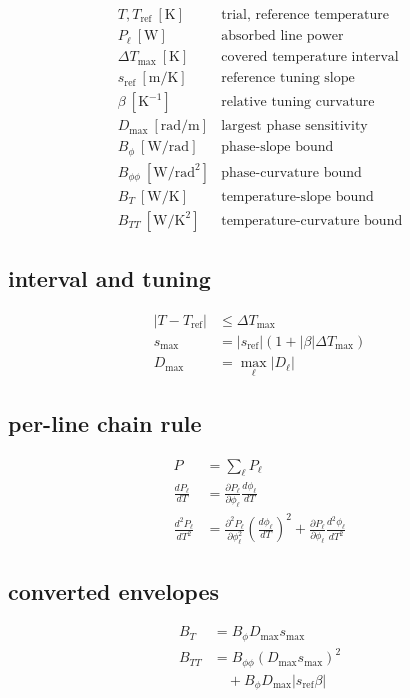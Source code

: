 \[
\begin{array}{ll}T,T_{\mathrm{ref}}\ [\mathrm K]&\text{trial, reference temperature}\\[0.6em]P_\ell\ [\mathrm W]&\text{absorbed line power}\\[0.6em]\Delta T_{\max}\ [\mathrm K]&\text{covered temperature interval}\\[0.6em]s_{\mathrm{ref}}\ [\mathrm{m/K}]&\text{reference tuning slope}\\[0.6em]\beta\ [\mathrm{K}^{-1}]&\text{relative tuning curvature}\\[0.6em]D_{\max}\ [\mathrm{rad/m}]&\text{largest phase sensitivity}\\[0.6em]B_\phi\ [\mathrm{W/rad}]&\text{phase-slope bound}\\[0.6em]B_{\phi\phi}\ [\mathrm{W/rad^2}]&\text{phase-curvature bound}\\[0.6em]B_T\ [\mathrm{W/K}]&\text{temperature-slope bound}\\[0.6em]B_{TT}\ [\mathrm{W/K^2}]&\text{temperature-curvature bound}\end{array}
\]

\subsection*{interval and tuning}
\[
\displaystyle \begin{aligned}|T-T_{\mathrm{ref}}|&\le\Delta T_{\max}\\s_{\max}&=|s_{\mathrm{ref}}|(1+|\beta|\Delta T_{\max})\\D_{\max}&=\max_\ell|D_\ell|\end{aligned}
\]

\subsection*{per-line chain rule}
\[
\displaystyle \begin{aligned}P&=\sum_\ell P_\ell\\\frac{dP_\ell}{dT}&=\frac{\partial P_\ell}{\partial\phi_\ell}\frac{d\phi_\ell}{dT}\\\frac{d^2P_\ell}{dT^2}&=\frac{\partial^2P_\ell}{\partial\phi_\ell^2}\left(\frac{d\phi_\ell}{dT}\right)^2+\frac{\partial P_\ell}{\partial\phi_\ell}\frac{d^2\phi_\ell}{dT^2}\end{aligned}
\]

\subsection*{converted envelopes}
\[
\displaystyle \begin{aligned}B_T&=B_\phi D_{\max}s_{\max}\\B_{TT}&=B_{\phi\phi}(D_{\max}s_{\max})^2\\&\quad+B_\phi D_{\max}|s_{\mathrm{ref}}\beta|\end{aligned}
\]

